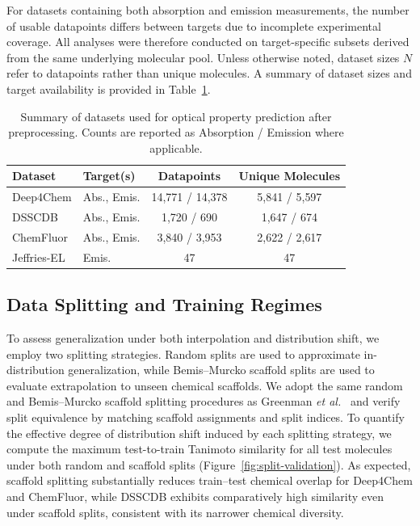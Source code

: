 For datasets containing both absorption and emission measurements, the number of usable datapoints differs between targets due to incomplete experimental coverage. All analyses were therefore conducted on target-specific subsets derived from the same underlying molecular pool. Unless otherwise noted, dataset sizes $N$ refer to datapoints rather than unique molecules. A summary of dataset sizes and target availability is provided in Table~\ref{tab:datasets}.


\begin{table}[ht]
\centering
\caption{Summary of datasets used for optical property prediction after preprocessing.
Counts are reported as Absorption / Emission where applicable.}
\label{tab:datasets}
\begin{tabular}{l l c c}
\toprule
\textbf{Dataset} 
& \textbf{Target(s)} 
& \textbf{Datapoints} 
& \textbf{Unique Molecules} \\
\midrule
Deep4Chem 
& Abs., Emis. 
& 14{,}771 / 14{,}378 
& 5{,}841 / 5{,}597 \\

DSSCDB 
& Abs., Emis. 
& 1{,}720 / 690 
& 1{,}647 / 674 \\

ChemFluor 
& Abs., Emis. 
& 3{,}840 / 3{,}953 
& 2{,}622 / 2{,}617 \\

Jeffries-EL 
& Emis. 
& 47 
& 47 \\
\bottomrule
\end{tabular}
\end{table}

\subsection{Data Splitting and Training Regimes}

To assess generalization under both interpolation and distribution shift, we employ two splitting strategies. Random splits are used to approximate in-distribution generalization, while Bemis--Murcko scaffold splits are used to evaluate extrapolation to unseen chemical scaffolds. We adopt the same random and Bemis--Murcko scaffold splitting procedures as Greenman \textit{et al.}~\cite{greenman2022multi} and verify split equivalence by matching scaffold assignments and split indices.
To quantify the effective degree of distribution shift induced by each splitting strategy, we compute the maximum test-to-train Tanimoto similarity for all test molecules under both random and scaffold splits (Figure~\ref{fig:split-validation}). As expected, scaffold splitting substantially reduces train–test chemical overlap for Deep4Chem and ChemFluor, while DSSCDB exhibits comparatively high similarity even under scaffold splits, consistent with its narrower chemical diversity.

